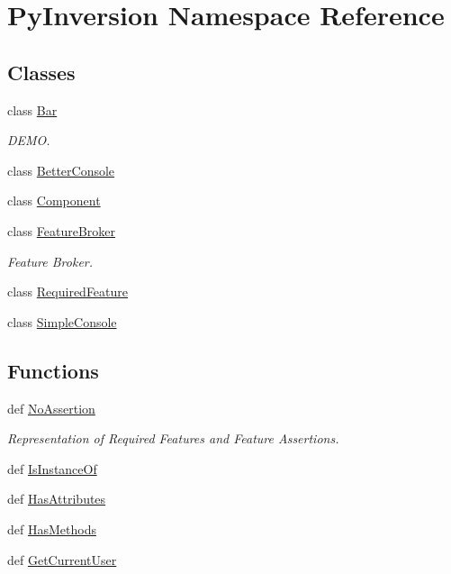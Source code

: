 \hypertarget{namespace_py_inversion}{\section{Py\+Inversion Namespace Reference}
\label{namespace_py_inversion}
}
\subsection*{Classes}
\begin{DoxyCompactItemize}
\item 
class \hyperlink{class_py_inversion_1_1_bar}{Bar}
\begin{DoxyCompactList}\small\item\em D\+E\+M\+O. \end{DoxyCompactList}\item 
class \hyperlink{class_py_inversion_1_1_better_console}{Better\+Console}
\item 
class \hyperlink{class_py_inversion_1_1_component}{Component}
\item 
class \hyperlink{class_py_inversion_1_1_feature_broker}{Feature\+Broker}
\begin{DoxyCompactList}\small\item\em Feature Broker. \end{DoxyCompactList}\item 
class \hyperlink{class_py_inversion_1_1_required_feature}{Required\+Feature}
\item 
class \hyperlink{class_py_inversion_1_1_simple_console}{Simple\+Console}
\end{DoxyCompactItemize}
\subsection*{Functions}
\begin{DoxyCompactItemize}
\item 
def \hyperlink{namespace_py_inversion_a188b1a2e50ba7079abd28f76308d8ee1}{No\+Assertion}
\begin{DoxyCompactList}\small\item\em Representation of Required Features and Feature Assertions. \end{DoxyCompactList}\item 
def \hyperlink{namespace_py_inversion_aef868798a7eac8ca225dd912b28ee196}{Is\+Instance\+Of}
\item 
def \hyperlink{namespace_py_inversion_ae61281915fdeaebe010d9660152ed2b5}{Has\+Attributes}
\item 
def \hyperlink{namespace_py_inversion_aa26f41ad968118f6feb4f754492b9246}{Has\+Methods}
\item 
def \hyperlink{namespace_py_inversion_aa73efe236b02a8a53f625fd15ec22ef2}{Get\+Current\+User}
\end{DoxyCompactItemize}
